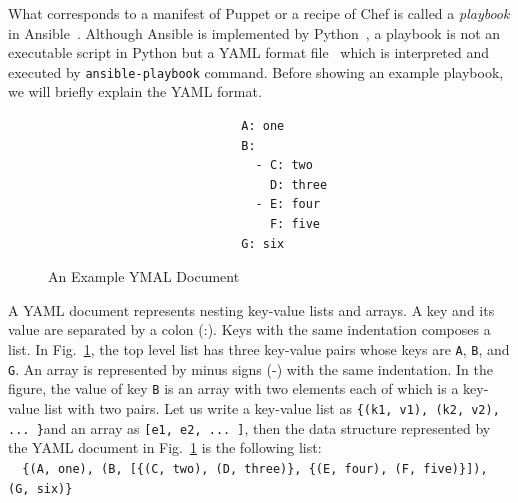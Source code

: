 \documentclass[12pt]{report}
\begin{document}
What corresponds to a manifest of Puppet or a recipe of Chef is called
a {\it playbook} in Ansible~\cite{Ansible}. Although Ansible is
implemented by Python~\cite{Python}, a playbook is not an executable
script in Python but a YAML format file~\cite{YAML} which is
interpreted and executed by {\tt ansible-playbook} command. Before
showing an example playbook, we will briefly explain the YAML format.
\begin{figure}
\small
\begin{verbatim}
                           A: one
                           B:
                             - C: two
                               D: three
                             - E: four
                               F: five
                           G: six
\end{verbatim}
\normalsize
\vspace{-0.6cm}
\caption{An Example YMAL Document}
\label{fig:YAMLExample}
\end{figure}
A YAML document represents nesting key-value lists and arrays. A key
and its value are separated by a colon (:). Keys with the same
indentation composes a list. In Fig.~\ref{fig:YAMLExample}, the top
level list has three key-value pairs whose keys are {\tt A}, {\tt B},
and {\tt G}.  An array is represented by minus signs (-) with the same
indentation.  In the figure, the value of key {\tt B} is an array with
two elements each of which is a key-value list with two pairs. Let us
write a key-value list as
\small\verb|{(k1, v1), (k2, v2), ... }|\normalsize and an array as
\small\verb|[e1, e2, ... ]|\normalsize, then the data structure
represented by the YAML document in Fig.~\ref{fig:YAMLExample} is the following list:
\\\small
\verb|  {(A, one), (B, [{(C, two), (D, three)}, {(E, four), (F, five)}]), (G, six)}|
\normalsize
\end{document}
